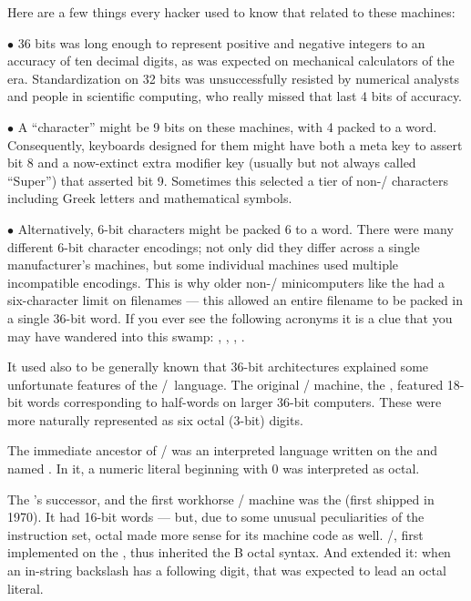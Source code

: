 Here are a few things every hacker used to know that related to these machines:
{\medbreak\narrower
\item{$\bullet$} 36 bits was long enough to represent positive and negative
integers to an accuracy of ten decimal digits, as was expected on mechanical
calculators of the era. Standardization on 32 bits was unsuccessfully resisted
by numerical analysts and people in scientific computing, who really missed
that last 4 bits of accuracy.

\item{$\bullet$} A ``character'' might be 9 bits on these machines, with 4 packed
to a word. Consequently, keyboards designed for them might have both a meta key
to assert bit 8 and a now-extinct extra modifier key (usually but not always
called ``Super'') that asserted bit 9. Sometimes this selected a tier of
non-\ASCII/ characters including Greek letters and mathematical symbols.

\item{$\bullet$} Alternatively, 6-bit characters might be packed 6 to a word.
There were many different 6-bit character encodings; not only did they differ
across a single manufacturer's machines, but some individual machines used
multiple incompatible encodings. This is why older non-\UNIX/ minicomputers like
the  had a six-character limit on filenames --- this allowed an entire
filename to be packed in a single 36-bit word. If you ever see the following
acronyms it is a clue that you may have wandered into this swamp: ,
, , .\medbreak}
\noindent It used also to be generally known that 36-bit architectures
explained some unfortunate features of the \CEE/~language. The original \UNIX/
machine, the , featured 18-bit words corresponding to half-words on larger
36-bit computers. These were more naturally represented as six octal (3-bit)
digits.

The immediate ancestor of \CEE/ was an interpreted language written on the 
and named . In it, a numeric literal beginning with 0 was interpreted as
octal.

The 's successor, and the first workhorse \UNIX/ machine was the 
(first shipped in 1970). It had 16-bit words --- but, due to some unusual
peculiarities of the instruction set, octal made more sense for its machine
code as well. \CEE/, first implemented on the , thus inherited the B octal
syntax. And extended it: when an in-string backslash has a following digit,
that was expected to lead an octal literal.


